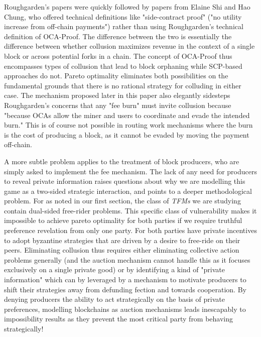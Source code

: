 \documentclass[sigconf,anonymous]{aamas}
\begin{document}
Roughgarden's papers were quickly followed by papers from Elaine Shi and Hao Chung, who offered technical definitions like "side-contract proof" ("no utility increase from off-chain payments") rather than using Roughgarden's technical definition of OCA-Proof. The difference between the two is essentially the difference between whether collusion maximizes revenue in the context of a single block or across potential forks in a chain. The concept of OCA-Proof thus encompasses types of collusion that lead to block orphaning while SCP-based approaches do not. Pareto optimality eliminates both possibilities on the fundamental grounds that there is no rational strategy for colluding in either case. The mechanism proposed later in this paper also elegantly sidesteps Roughgarden's concerns that any "fee burn" must invite collusion because "because OCAs allow the miner and users to coordinate and evade the intended burn." This is of course not possible in routing work mechanisms where the burn is the cost of producing a block, as it cannot be evaded by moving the payment off-chain.





A more subtle problem applies to the treatment of block producers, who are simply asked to implement the fee mechanism. The lack of any need for producers to reveal private information raises questions about why we are modelling this game as a two-sided strategic interaction, and points to a deeper methodological problem. For as noted in our first section, the class of \textit{TFMs} we are studying contain dual-sided free-rider problems. This specific class of vulnerability makes it impossible to achieve pareto optimality for both parties if we require truthful preference revelation from only one party. For both parties have private incentives to adopt byzantine strategies that are driven by a desire to free-ride on their peers. Eliminating collusion thus requires either eliminating collective action problems generally (and the auction mechanism cannot handle this as it focuses exclusively on a single private good) or by identifying a kind of "private information" which can by leveraged by a mechanism to motivate producers to shift their strategies away from defunding fection and towards cooperation. By denying producers the ability to act strategically on the basis of private preferences, modelling blockchains as auction mechanisms leads inescapably to impossibility results as they prevent the most critical party from behaving strategically!
\end{document}
